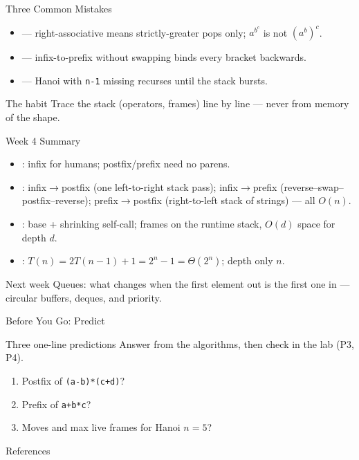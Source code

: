 \documentclass[aspectratio=169]{beamer}
\begin{document}
\begin{frame}{Three Common Mistakes}
  \begin{itemize}
    \item {} --- right-associative means
      strictly-greater pops only; $a^{b^{c}}$ is not $(a^{b})^{c}$.
    \item {} --- infix-to-prefix
      without swapping binds every bracket backwards.
    \item {} --- Hanoi with
      \texttt{n-1} missing recurses until the stack bursts.
  \end{itemize}
  \begin{exampleblock}{The habit}
    Trace the stack (operators, frames) line by line --- never from memory
    of the shape.
  \end{exampleblock}
\end{frame}

\begin{frame}{Week 4 Summary}
  \begin{itemize}
    \item {}: infix for humans; postfix/prefix need no parens.
    \item {}: infix$\to$postfix (one left-to-right stack
      pass); infix$\to$prefix (reverse--swap--postfix--reverse);
      prefix$\to$postfix (right-to-left stack of strings) --- all $O(n)$.
    \item {}: base + shrinking self-call; frames on the runtime
      stack, $O(d)$ space for depth $d$.
    \item {}: $T(n) = 2T(n-1) + 1 = 2^{n} - 1 = \Theta(2^{n})$;
      depth only $n$.
  \end{itemize}
  \begin{exampleblock}{Next week}
    Queues: what changes when the first element out is the first one in ---
    circular buffers, deques, and priority.
  \end{exampleblock}
\end{frame}

\begin{frame}{Before You Go: Predict}
  \begin{block}{Three one-line predictions}
    Answer from the algorithms, then check in the lab (P3, P4).
  \end{block}
  \begin{enumerate}
    \item Postfix of \texttt{(a-b)*(c+d)}?
    \item Prefix of \texttt{a+b*c}?
    \item Moves and max live frames for Hanoi $n = 5$?
  \end{enumerate}
\end{frame}

\begin{frame}[allowframebreaks]{References}
  \footnotesize
  
  
\end{frame}
\end{document}
